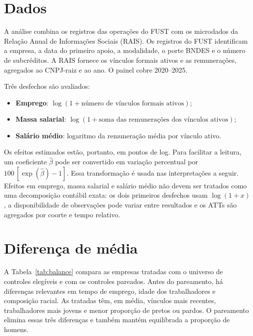 \documentclass[12pt,a4paper]{article}
\begin{document}
\section{Dados}

A análise combina os registros das operações do FUST com os microdados da Relação Anual de
Informações Sociais (RAIS). Os registros do FUST identificam a empresa, a data do primeiro apoio,
a modalidade, o porte BNDES e o número de subcréditos. A RAIS fornece os vínculos formais ativos e as
remunerações, agregados ao CNPJ-raiz e ao ano. O painel cobre 2020--2025.

Três desfechos são avaliados:
\begin{itemize}
  \item \textbf{Emprego}: $\log(1+\text{número de vínculos formais ativos})$;
  \item \textbf{Massa salarial}: $\log(1+\text{soma das remunerações dos vínculos ativos})$;
  \item \textbf{Salário médio}: logaritmo da remuneração média por vínculo ativo.
\end{itemize}

Os efeitos estimados estão, portanto, em pontos de log. Para facilitar a leitura, um coeficiente
$\widehat\beta$ pode ser convertido em variação percentual por
$100\,[\exp(\widehat\beta)-1]$. Essa transformação é usada nas interpretações a seguir. Efeitos
em emprego, massa salarial e salário médio não devem ser tratados como uma decomposição contábil
exata: os dois primeiros desfechos usam $\log(1+x)$, a disponibilidade de observações pode variar
entre resultados e os ATTs são agregados por coorte e tempo relativo.

\section{Diferença de média}

A Tabela~\ref{tab:balance} compara as empresas tratadas com o universo de controles elegíveis e
com os controles pareados. Antes do pareamento, há diferenças relevantes em tempo de emprego,
idade dos trabalhadores e composição racial. As tratadas têm, em média, vínculos mais recentes,
trabalhadores mais jovens e menor proporção de pretos ou pardos. O pareamento elimina essas três
diferenças e também mantém equilibrada a proporção de homens.
\end{document}
